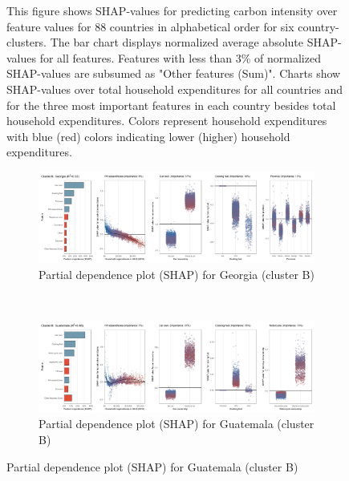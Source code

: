 \begin{figure}[ht!]
    \begin{subcaption2}
     This figure shows SHAP-values for predicting carbon intensity over feature values for 88 countries in alphabetical order for six country-clusters. The bar chart displays normalized average absolute SHAP-values for all features. Features with less than 3\% of normalized SHAP-values are subsumed as "Other features (Sum)". Charts show SHAP-values over total household expenditures for all countries and for the three most important features in each country besides total household expenditures. Colors represent household expenditures with blue (red) colors indicating lower (higher) household expenditures.
     \end{subcaption2}
\end{figure}

\begin{figure}[ht!]\ContinuedFloat
    \centering
   \begin{subfigure}[b]{\textwidth}
   \centering
         \caption{Partial dependence plot (SHAP) for Georgia (cluster B)}
         \label{fig:5b_GEO}
         \includegraphics[width=\textwidth]{Figure 5b/Figure_5b_GEO}
         \end{subfigure}
    \\
    \vspace{0.5cm}
    \begin{subfigure}[b]{\textwidth}
           \centering
         \caption{Partial dependence plot (SHAP) for Guatemala (cluster B)}
         \label{fig:5b_GTM}
         \includegraphics[width=\textwidth]{Figure 5b/Figure_5b_GTM}
         \end{subfigure}

\end{figure}
